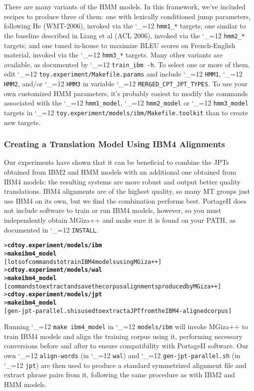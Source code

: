 \documentclass[11pt,letterpaper]{article}
\newcommand{\PS}{PortageII\xspace}
\def\code{\begingroup\catcode`\_=12 \codex}
\newcommand{\codex}[1]{\texttt{#1}\endgroup}
\begin{document}
There are many variants of the HMM models.  In this framework, we've included
recipes to produce three of them: one with lexically conditioned jump
parameters, following He (WMT-2006), invoked via the \code{hmm1_*} targets;
one similar to the baseline described in Liang et al (ACL 2006), invoked via
the \code{hmm2_*} targets; and one tuned in-house to maximize BLEU scores on
French-English material, invoked via the \code{hmm3_*} targets.  Many other
variants are available, as documented by \code{train_ibm -h}. To select one or
more of them, edit \code{toy.experiment/Makefile.params} and include
\code{HMM1}, \code{HMM2}, and/or \code{HMM3} in variable
\code{MERGED_CPT_JPT_TYPES}.
To use your own customized HMM parameters, it's probably easiest to modify the commands
associated with the \code{hmm1_model}, \code{hmm2_model} or \code{hmm3_model}
targets in \code{toy.experiment/models/ibm/Makefile.toolkit} than to create new targets.

\subsubsection{Creating a Translation Model Using IBM4 Alignments} \label{IBM4}

Our experiments have shown that it can be beneficial to combine the JPTs
obtained from IBM2 and HMM models with an additional one obtained from IBM4
models: the resulting systems are more robust and output better quality
translations.
IBM4 alignments are of the highest quality, so many MT groups just use IBM4 on its own,
but we find the combination performs best.
\PS does not include software to train or run IBM4 models,
however, so you must independently obtain MGiza++ and make sure it is found on
your PATH, as documented in \code{INSTALL}.

\begin{small}
\begin{alltt}
   > \textbf{cd toy.experiment/models/ibm}
   > \textbf{make ibm4_model}
   [lots of commands to train IBM4 models using MGiza++]
   > \textbf{cd toy.experiment/models/wal}
   > \textbf{make ibm4_model}
   [commands to extract and save the corpus alignments produced by MGiza++]
   > \textbf{cd toy.experiment/models/jpt}
   > \textbf{make ibm4_model}
   [gen-jpt-parallel.sh is used to extract a JPT from the IBM4-aligned corpus]
\end{alltt}
\end{small}
%
Running \code{make ibm4_model} in \code{models/ibm} will invoke MGiza++ to train
IBM4 models and align the training corpus using it, performing necessary
conversions before and after to ensure compatibility with \PS software.  Our
own \code{align-words} (in \code{wal}) and \code{gen-jpt-parallel.sh} (in
\code{jpt}) are then used to produce a standard symmetrized alignment file and
extract phrase pairs from it, following the same procedure as with IBM2
and HMM models.
\end{document}
